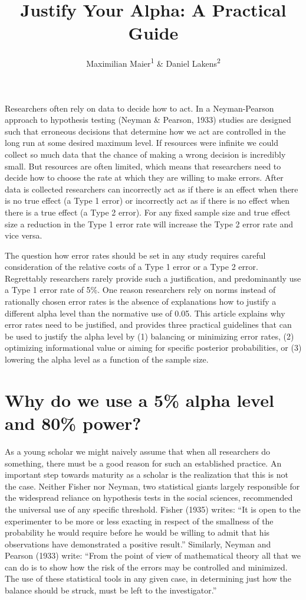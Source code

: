 \documentclass[
  english,
  ,jou,floatsintext]{apa6}
\title{Justify Your Alpha: A Practical Guide}
\author{Maximilian Maier\textsuperscript{1} \& Daniel Lakens\textsuperscript{2}}
\date{}
\affiliation{\vspace{0.5cm}\textsuperscript{1} University of Amsterdam, The Netherlands\\\textsuperscript{2} Eindhoven University of Technology, The Netherlands}
\begin{document}
\maketitle

Researchers often rely on data to decide how to act. In a Neyman-Pearson approach to hypothesis testing (Neyman \& Pearson, 1933) studies are designed such that erroneous decisions that determine how we act are controlled in the long run at some desired maximum level. If resources were infinite we could collect so much data that the chance of making a wrong decision is incredibly small. But resources are often limited, which means that researchers need to decide how to choose the rate at which they are willing to make errors. After data is collected researchers can incorrectly act as if there is an effect when there is no true effect (a Type 1 error) or incorrectly act as if there is no effect when there is a true effect (a Type 2 error). For any fixed sample size and true effect size a reduction in the Type 1 error rate will increase the Type 2 error rate and vice versa.

The question how error rates should be set in any study requires careful consideration of the relative costs of a Type 1 error or a Type 2 error. Regrettably researchers rarely provide such a justification, and predominantly use a Type 1 error rate of 5\%. One reason researchers rely on norms instead of rationally chosen error rates is the absence of explanations how to justify a different alpha level than the normative use of 0.05. This article explains why error rates need to be justified, and provides three practical guidelines that can be used to justify the alpha level by (1) balancing or minimizing error rates, (2) optimizing informational value or aiming for specific posterior probabilities, or (3) lowering the alpha level as a function of the sample size.

\hypertarget{why-do-we-use-a-5-alpha-level-and-80-power}{%
\section{Why do we use a 5\% alpha level and 80\% power?}\label{why-do-we-use-a-5-alpha-level-and-80-power}}

As a young scholar we might naively assume that when all researchers do something, there must be a good reason for such an established practice. An important step towards maturity as a scholar is the realization that this is not the case. Neither Fisher nor Neyman, two statistical giants largely responsible for the widespread reliance on hypothesis tests in the social sciences, recommended the universal use of any specific threshold. Fisher (1935) writes: ``It is open to the experimenter to be more or less exacting in respect of the smallness of the probability he would require before he would be willing to admit that his observations have demonstrated a positive result.'' Similarly, Neyman and Pearson (1933) write: ``From the point of view of mathematical theory all that we can do is to show how the risk of the errors may be controlled and minimized. The use of these statistical tools in any given case, in determining just how the balance should be struck, must be left to the investigator.''
\end{document}
